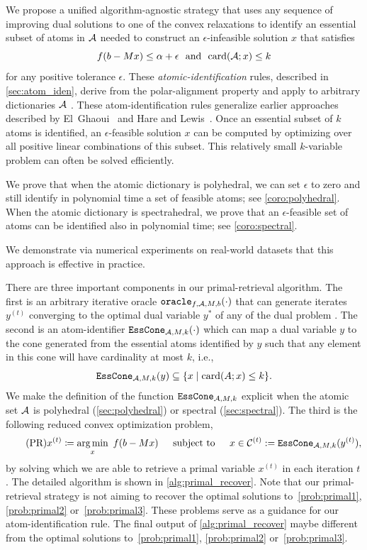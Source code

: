 We propose a unified algorithm-agnostic strategy that uses any sequence of improving dual solutions to one of the convex relaxations to identify an essential subset of atoms in $\mathcal{A}$ needed to construct an $\epsilon$-infeasible solution $x$ that satisfies
\begin{equation} \label{eq:feasible}
    f(b - Mx) \leq \alpha + \epsilon \enspace\mathop{\hbox{\rm and}}\enspace \operatorname{card}(\mathcal{A}; x) \leq k
\end{equation}
for any positive tolerance $\epsilon$. These \emph{atomic-identification} rules, described in \autoref{sec:atom_iden}, derive from the polar-alignment property and apply to arbitrary dictionaries $\mathcal{A}$ \cite{fan2019alignment}. These atom-identification rules generalize earlier approaches described by El~Ghaoui~\cite{Ghaoui12} and Hare and Lewis~\cite{hare2004identifying}. Once an essential subset of $k$ atoms is identified, an $\epsilon$-feasible solution $x$ can be computed by optimizing over all positive linear combinations of this subset. This relatively small $k$-variable problem can often be solved efficiently.

We prove that when the atomic dictionary is polyhedral, we can set $\epsilon$ to zero and still identify in polynomial time a set of feasible atoms; see \autoref{coro:polyhedral}. When the atomic dictionary is spectrahedral, we prove that an $\epsilon$-feasible set of atoms can be identified also in polynomial time; see \autoref{coro:spectral}. 

We demonstrate via numerical experiments on real-world datasets that this approach is effective in practice.

There are three important components in our primal-retrieval algorithm. The first is an arbitrary iterative oracle $\texttt{oracle}_{f,\mathcal{A},M,b}(\cdot)$ that can generate iterates $y^{(t)}$ converging to the optimal dual variable $y^*$ of any of the dual problem \Drobi. The second is an atom-identifier $\texttt{EssCone}_{\mathcal{A}, M, k}(\cdot)$ which can map a dual variable $y$ to the cone generated from the essential atoms identified by $y$ such that any element in this cone will have cardinality at most $k$, i.e., 
\[\texttt{EssCone}_{\mathcal{A}, M, k}(y) \subseteq \{x \mid \operatorname{card}(A; x) \leq k\}.\]
We make the definition of the function $\texttt{EssCone}_{\mathcal{A}, M, k}$ explicit when the atomic set $\mathcal{A}$ is polyhedral (\autoref{sec:polyhedral}) or spectral (\autoref{sec:spectral}). The third is the following reduced convex optimization problem,  
\begin{equation} \label{eq:primal_recover} \tag{PR}
    x^{(t)} \coloneqq \underset{x}{\textrm{arg}\,{\min}}\enskip f(b - Mx) \enspace\hbox{\quad subject to\quad}\enspace x \in \mathcal{C}^{(t)} := \texttt{EssCone}_{\mathcal{A}, M, k}(y^{(t)}),
\end{equation}
by solving which we are able to retrieve a primal variable $x^{(t)}$ in each iteration $t$.
The detailed algorithm is shown in \autoref{alg:primal_recover}. Note that our primal-retrieval strategy is not aiming to recover the optimal solutions to~\eqref{prob:primal1}, \eqref{prob:primal2} or~\eqref{prob:primal3}. These problems serve as a guidance for our atom-identification rule. The final output of \autoref{alg:primal_recover} maybe different from the optimal solutions to~\eqref{prob:primal1}, \eqref{prob:primal2} or~\eqref{prob:primal3}. 

